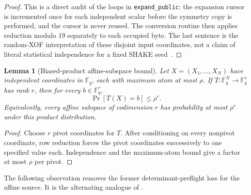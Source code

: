 \documentclass[11pt]{article}
\newtheorem{lemma}[lemma]{Lemma}
\newcommand{\F}{\mathbb F}
\begin{document}
\begin{proof}
This is a direct audit of the loops in \texttt{expand\_public}: the expansion
cursor is incremented once for each independent scalar before the symmetry
copy is performed, and the cursor is never reused.  The conversion routine
then applies reduction modulo $19$ separately to each occupied byte.  The
last sentence is the random-XOF interpretation of these disjoint input
coordinates, not a claim of literal statistical independence for a fixed
SHAKE seed~\cite{SNOVA23}.
\end{proof}
\begin{lemma}[Biased-product affine-subspace bound]
\label{lem:biased-affine-subspace}
Let $X=(X_1,\ldots,X_N)$ have independent coordinates in $\F_q$, each with
maximum atom at most $\rho$.  If $T:\F_q^N\to\F_q^r$ has rank $r$, then for
every $b\in\F_q^r$,
\begin{equation}\label{eq:biased-affine-bound}
 \Pr[T(X)=b]\le \rho^r.
\end{equation}
Equivalently, every affine subspace of codimension $r$ has probability at most
$\rho^r$ under this product distribution.
\end{lemma}

\begin{proof}
Choose $r$ pivot coordinates for $T$.  After conditioning on every nonpivot
coordinate, row reduction forces the pivot coordinates successively to one
specified value each.  Independence and the maximum-atom bound give a factor
at most $\rho$ per pivot.
\end{proof}

The following observation removes the former determinant-preflight loss for
the affine source.  It is the alternating analogue of
.
\end{document}
